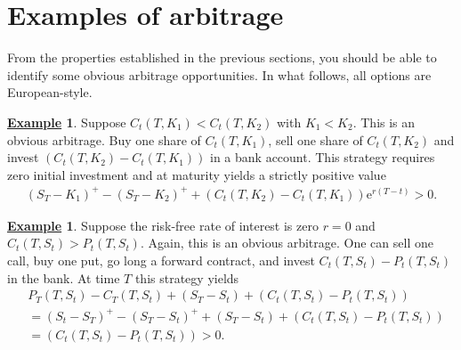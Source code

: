 \documentclass[12pt]{book}
\numberwithin{equation}{chapter}
\theoremstyle{plain}
\numberwithin{theorem}{section}
\theoremstyle{definition}
\newtheorem{example}[theorem]{\underline{Example}}
\numberwithin{exercise}{chapter}
\newcommand{\<}{\langle}
\renewcommand{\>}{\rangle}
\renewcommand{\(}{\left(}
\renewcommand{\)}{\right)}
\renewcommand{\[}{\left[}
\renewcommand{\]}{\right]}
\newcommand\ee{\mathrm{e}}
\theoremstyle{definition}
\numberwithin{question}{section}
\begin{document}
\section{Examples of arbitrage}
From the properties established in the previous sections, you should be able to identify some obvious arbitrage opportunities.  In what follows, all options are European-style.

\begin{example}
Suppose $C_t(T,K_1) < C_t(T,K_2)$ with $K_1 < K_2$.  This is an obvious arbitrage.  Buy one share of $C_t(T,K_1)$, sell one share of $C_t(T,K_2)$ and invest $(C_t(T,K_2)-C_t(T,K_1))$ in a bank account.  This strategy requires zero initial investment and at maturity yields a strictly positive value
\begin{align}
(S_T - K_1)^+ - (S_T - K_2)^+ + (C_t(T,K_2) -C_t(T,K_1) ) \ee^{r(T-t)} > 0 .
\end{align}
\end{example}

\begin{example}
Suppose the risk-free rate of interest is zero $r=0$ and $C_t(T,S_t) > P_t(T,S_t)$.  Again, this is an obvious arbitrage.  One can sell one call, buy one put, go long a forward contract, and invest $C_t(T,S_t) - P_t(T,S_t)$ in the bank.  At time $T$ this strategy yields
\begin{align}
&P_T(T,S_t) - C_T(T,S_t) + (S_T - S_t) + (C_t(T,S_t) - P_t(T,S_t)) \\
	&=	(S_t - S_T)^+ - (S_T - S_t)^+ + (S_T - S_t) +  (C_t(T,S_t) - P_t(T,S_t)) \\
	&=	(C_t(T,S_t) - P_t(T,S_t))  > 0 .
\end{align}
\end{example}
\end{document}
